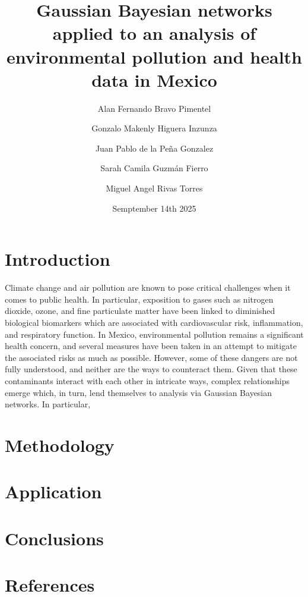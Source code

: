 \documentclass[twocolumn]{article}
\title{Gaussian Bayesian networks applied to an analysis of environmental pollution and health data in Mexico }
\author{
Alan Fernando Bravo Pimentel \and
Gonzalo Makenly Higuera Inzunza \and
Juan Pablo de la Peña Gonzalez \and
Sarah Camila Guzmán Fierro \and
Miguel Angel Rivas Torres
}
\date{Semptember 14th 2025}
\begin{document}
\maketitle

\begin{abstract}
\end{abstract}

\section{Introduction}
Climate change and air pollution are known to pose critical challenges when it comes to public health. In particular, exposition to gases such as nitrogen dioxide, ozone, and fine particulate matter have been linked to diminished biological biomarkers which are associated with cardiovascular risk, inflammation, and respiratory function. In Mexico, environmental pollution remains a significant health concern, and several measures have been taken in an attempt to mitigate the associated risks as much as possible. However, some of these dangers are not fully understood, and neither are the ways to counteract them.
Given that these contaminants interact with each other in intricate ways, complex relationships emerge which, in turn,  lend themselves to analysis via Gaussian Bayesian networks. 
In particular, 


\section{Methodology}



\section{Application}


\section{Conclusions}


\section{References}
\begin{thebibliography}{9}
\setlength{\itemsep}{0pt}
\setlength{\parskip}{0pt}




\end{thebibliography}
\end{document}
